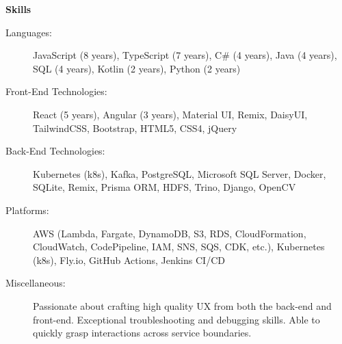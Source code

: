 \documentclass[letterpaper,11pt]{article}
\newcommand{\resheading}[1]{{\large \colorbox{mygrey}{\begin{minipage}{\textwidth}{\textbf{#1 \vphantom{p\^{E}}}}\end{minipage}}}}
\begin{document}
\resheading{Skills}
\begin{description}
	\item[Languages:]
	JavaScript (8 years), TypeScript (7 years), C\# (4 years), Java (4 years), SQL (4 years), Kotlin (2 years), Python (2 years)
	\item[Front-End Technologies:]
	React (5 years), Angular (3 years), Material UI, Remix, DaisyUI, TailwindCSS, Bootstrap, HTML5, CSS4, jQuery
	\item[Back-End Technologies:]
	Kubernetes (k8s), Kafka, PostgreSQL, Microsoft SQL Server, Docker, SQLite, Remix, Prisma ORM, HDFS, Trino, Django, OpenCV
	\item[Platforms:]
	AWS (Lambda, Fargate, DynamoDB, S3, RDS, CloudFormation, CloudWatch, CodePipeline, IAM, SNS, SQS, CDK, etc.), Kubernetes (k8s), Fly.io, GitHub Actions, Jenkins CI/CD
	\item[Miscellaneous:]
	Passionate about crafting high quality UX from both the back-end and front-end. Exceptional troubleshooting and debugging skills. Able to quickly grasp interactions across service boundaries.
\end{description}
\end{document}

